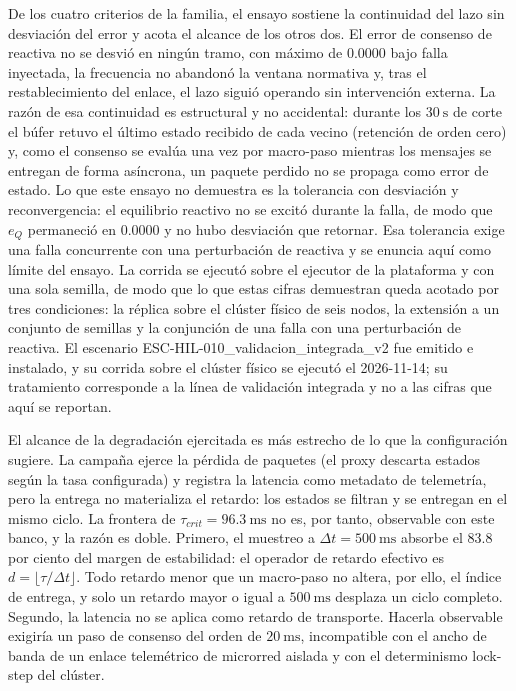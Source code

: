De los cuatro criterios de la familia, el ensayo sostiene la continuidad del lazo sin desviación del error y acota el alcance de los otros dos. El error de consenso de reactiva no se desvió en ningún tramo, con máximo de $0.0000$ bajo falla inyectada, la frecuencia no abandonó la ventana normativa y, tras el restablecimiento del enlace, el lazo siguió operando sin intervención externa. La razón de esa continuidad es estructural y no accidental: durante los $30\ \text{s}$ de corte el búfer retuvo el último estado recibido de cada vecino (retención de orden cero) y, como el consenso se evalúa una vez por macro-paso mientras los mensajes se entregan de forma asíncrona, un paquete perdido no se propaga como error de estado. Lo que este ensayo no demuestra es la tolerancia con desviación y reconvergencia: el equilibrio reactivo no se excitó durante la falla, de modo que $e_Q$ permaneció en $0.0000$ y no hubo desviación que retornar. Esa tolerancia exige una falla concurrente con una perturbación de reactiva y se enuncia aquí como límite del ensayo. La corrida se ejecutó sobre el ejecutor de la plataforma y con una sola semilla, de modo que lo que estas cifras demuestran queda acotado por tres condiciones: la réplica sobre el clúster físico de seis nodos, la extensión a un conjunto de semillas y la conjunción de una falla con una perturbación de reactiva. El escenario ESC-HIL-010\_validacion\_integrada\_v2 fue emitido e instalado, y su corrida sobre el clúster físico se ejecutó el 2026-11-14; su tratamiento corresponde a la línea de validación integrada y no a las cifras que aquí se reportan.

El alcance de la degradación ejercitada es más estrecho de lo que la configuración sugiere. La campaña ejerce la pérdida de paquetes (el proxy descarta estados según la tasa configurada) y registra la latencia como metadato de telemetría, pero la entrega no materializa el retardo: los estados se filtran y se entregan en el mismo ciclo. La frontera de $\tau_{crit} = 96.3\ \text{ms}$ no es, por tanto, observable con este banco, y la razón es doble. Primero, el muestreo a $\Delta t = 500\ \text{ms}$ absorbe el $83.8$ por ciento del margen de estabilidad: el operador de retardo efectivo es $d = \lfloor \tau/\Delta t \rfloor$. Todo retardo menor que un macro-paso no altera, por ello, el índice de entrega, y solo un retardo mayor o igual a $500\ \text{ms}$ desplaza un ciclo completo. Segundo, la latencia no se aplica como retardo de transporte. Hacerla observable exigiría un paso de consenso del orden de $20\ \text{ms}$, incompatible con el ancho de banda de un enlace telemétrico de microrred aislada y con el determinismo lock-step del clúster.

